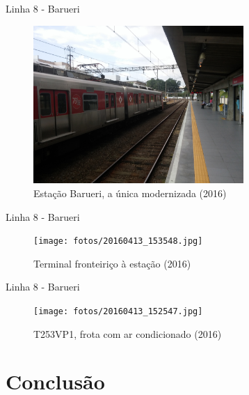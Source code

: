 \documentclass[spectratio=169, portuguese]{beamer}
\begin{document}

\begin{frame}{Linha 8 - Barueri}
	
	\begin{figure}[h]
		\caption{Estação Barueri, a única modernizada (2016)}
		\includegraphics[keepaspectratio,width=8cm]{fotos/20160413_154933_HDR.jpg}
	\end{figure}
	
\end{frame}


\begin{frame}{Linha 8 - Barueri}
	
	\begin{figure}[h]
		\caption{Terminal fronteiriço à estação (2016)}
		\texttt{[image: fotos/20160413\_153548.jpg]}
	\end{figure}
	
\end{frame}



\begin{frame}{Linha 8 - Barueri}
	
	\begin{figure}[h]
		\caption{T253VP1, frota com ar condicionado (2016)}
		\texttt{[image: fotos/20160413\_152547.jpg]}
	\end{figure}
	
\end{frame}

\section{Conclusão}
\end{document}
